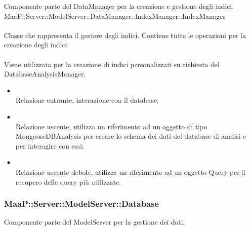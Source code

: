 Componente parte del DataManager per la creazione e gestione degli indici.
\\
MaaP::Server::ModelServer::DataManager::IndexManager::IndexManager\\
\\
Classe che rappresenta il gestore degli indici. Contiene tutte le operazioni per la creazione degli indici.\\
\\
Viene utilizzata per la creazione di indici personalizzati su richiesta del DatabaseAnalysisManager.\\
\begin{itemize}
\item{}\\
Relazione entrante, interazione con il database;
\item{}\\
Relazione uscente, utilizza un riferimento ad un oggetto di tipo MongooseDBAnalysis per creare lo schema dei dati del database di analisi e per interagire con essi;
\item{}\\
Relazione uscente debole, utilizza un riferimento ad un oggetto Query per il recupero delle query più utilizzate.
\end{itemize}

\subsubsection{MaaP::Server::ModelServer::Database}
Componente parte del ModelServer per la gestione dei dati.

